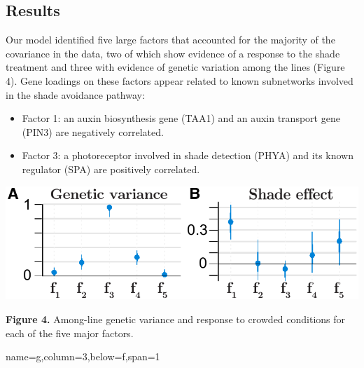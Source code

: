 \documentclass[landscape,paperwidth=48in,paperheight=36in,fontscale=0.35]{baposter}
\begin{document}
\begin{poster}
{\subsection*{Results}
Our model identified five large factors that accounted for the majority of the covariance in the data, two of which show evidence of a response to the shade treatment and three with evidence of genetic variation among the lines (Figure 4). Gene loadings on these factors appear related to known subnetworks involved in the shade avoidance pathway:
\begin{itemize}
\item Factor 1: an auxin biosynthesis gene (TAA1) and an auxin transport gene (PIN3) are negatively correlated.
\item Factor 3: a photoreceptor involved in shade detection (PHYA) and its known regulator (SPA) are positively correlated.
\end{itemize}

\begin{center}
\includegraphics[width=1\columnwidth]{Figure_factors2.pdf} 
\end{center}
\textbf{Figure 4.} Among-line genetic variance and response to crowded conditions for each of the five major factors.
}
 {name=g,column=3,below=f,span=1}{

%

}

\end{poster}
\end{document}
